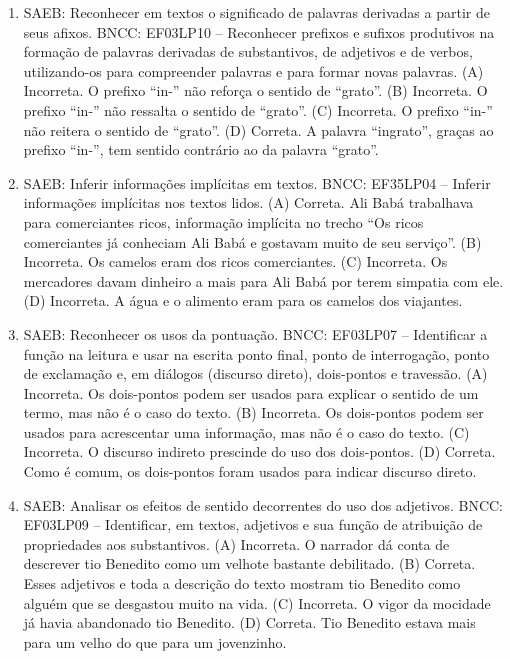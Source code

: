 \begin{enumerate}
\item
SAEB: Reconhecer em textos o significado de palavras derivadas a partir de seus afixos.
BNCC: EF03LP10 -- Reconhecer prefixos e sufixos produtivos na formação de
palavras derivadas de substantivos, de adjetivos e de verbos,
utilizando-os para compreender palavras e para formar novas palavras.
(A) Incorreta. O prefixo ``in-'' não reforça o sentido de ``grato''.
(B) Incorreta. O prefixo ``in-'' não ressalta o sentido de ``grato''.
(C) Incorreta. O prefixo ``in-'' não reitera o sentido de ``grato''.
(D) Correta. A palavra ``ingrato'', graças ao prefixo ``in-'', tem sentido contrário ao da palavra ``grato''.

\item
SAEB: Inferir informações implícitas em textos.
BNCC: EF35LP04 -- Inferir informações implícitas nos textos lidos.
(A) Correta. Ali Babá trabalhava para comerciantes ricos, informação
implícita no trecho ``Os ricos comerciantes já conheciam Ali Babá e
gostavam muito de seu serviço''.
(B) Incorreta. Os camelos eram dos ricos comerciantes.
(C) Incorreta. Os mercadores davam dinheiro a mais para Ali Babá por
terem simpatia com ele.
(D) Incorreta. A água e o alimento eram para os camelos dos viajantes.

\item
SAEB: Reconhecer os usos da pontuação.
BNCC: EF03LP07 -- Identificar a função na leitura e usar na escrita ponto final, ponto
de interrogação, ponto de exclamação e, em diálogos (discurso direto), dois-pontos e
travessão.
(A) Incorreta. Os dois-pontos podem ser usados para explicar o sentido de um termo, mas não é o caso do texto.
(B) Incorreta. Os dois-pontos podem ser usados para acrescentar uma informação, mas não é o caso do texto.
(C) Incorreta. O discurso indireto prescinde do uso dos dois-pontos.
(D) Correta. Como é comum, os dois-pontos foram usados para indicar discurso direto.

\item
SAEB: Analisar os efeitos de sentido decorrentes do uso dos adjetivos.
BNCC: EF03LP09 -- Identificar, em textos, adjetivos e sua função de atribuição de propriedades
aos substantivos.
(A) Incorreta. O narrador dá conta de descrever tio Benedito como um velhote bastante debilitado.
(B) Correta. Esses adjetivos e toda a descrição do texto mostram tio Benedito como alguém que se desgastou muito na vida.
(C) Incorreta. O vigor da mocidade já havia abandonado tio Benedito.
(D) Correta. Tio Benedito estava mais para um velho do que para um jovenzinho.


\end{enumerate}
